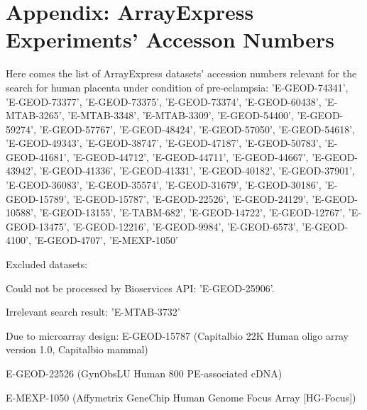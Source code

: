 \documentclass[conference]{IEEEtran}
\begin{document}
\section*{Appendix: ArrayExpress Experiments' Accesson Numbers}
Here comes the list of ArrayExpress datasets' accession numbers relevant for the search for human placenta under condition of pre-eclampsia: 'E-GEOD-74341', 'E-GEOD-73377', 'E-GEOD-73375', 'E-GEOD-73374', 'E-GEOD-60438', 'E-MTAB-3265', 'E-MTAB-3348', 'E-MTAB-3309', 'E-GEOD-54400', 'E-GEOD-59274', 'E-GEOD-57767', 'E-GEOD-48424', 'E-GEOD-57050', 'E-GEOD-54618', 'E-GEOD-49343', 'E-GEOD-38747', 'E-GEOD-47187', 'E-GEOD-50783', 'E-GEOD-41681', 'E-GEOD-44712', 'E-GEOD-44711', 'E-GEOD-44667', 'E-GEOD-43942', 'E-GEOD-41336', 'E-GEOD-41331', 'E-GEOD-40182', 'E-GEOD-37901', 'E-GEOD-36083', 'E-GEOD-35574', 'E-GEOD-31679', 'E-GEOD-30186', 'E-GEOD-15789', 'E-GEOD-15787', 'E-GEOD-22526', 'E-GEOD-24129', 'E-GEOD-10588', 'E-GEOD-13155', 'E-TABM-682', 'E-GEOD-14722', 'E-GEOD-12767', 'E-GEOD-13475', 'E-GEOD-12216', 'E-GEOD-9984', 'E-GEOD-6573', 'E-GEOD-4100', 'E-GEOD-4707', 'E-MEXP-1050'

Excluded datasets:

Could not be processed by Bioservices API: 'E-GEOD-25906'.

Irrelevant search result: 'E-MTAB-3732'

Due to microarray design: E-GEOD-15787 (Capitalbio 22K Human oligo array version 1.0, Capitalbio mammal)

E-GEOD-22526 (GynObsLU Human 800 PE-associated cDNA)

E-MEXP-1050 (Affymetrix GeneChip Human Genome Focus Array [HG-Focus])


\end{document}
